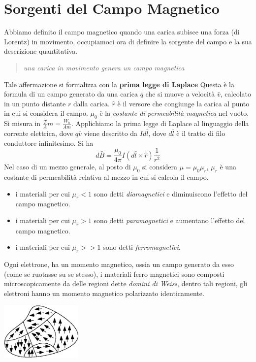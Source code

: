 \documentclass[10pt, letterpaper]{report}
\begin{document}
\section{Sorgenti del Campo Magnetico}
Abbiamo definito il campo magnetico quando una carica subisce una forza (di Lorentz) in movimento, occupiamoci ora di definire la sorgente del campo e la sua descrizione quantitativa. \begin{quote}
    \textit{una carica in movimento genera un campo magnetica}
\end{quote}
Tale affermazione si formalizza con la \textbf{prima legge di Laplace} 
Questa è la formula di un campo generato da una carica $q$ che si muove a velocità $\bar v$, calcolato in un punto distante $r$ dalla carica. $\hat r$ è il versore che congiunge la carica al punto in cui si considera il campo.\acc 
$\mu_0$ è la \textit{costante di permeabilità magnetica} nel vuoto. Si misura in $\frac{T}{A}m=\frac{W_b}{Am}$.\acc 
Applichiamo la prima legge di Laplace al linguaggio della corrente elettrica, dove $q\bar v$ viene descritto da $I d\bar l$, dove $d\bar l$ è il tratto di filo conduttore infinitesimo. Si ha 
$$ d\bar B=\frac{\mu_0}{4\pi}I(d\bar l \times \hat r)\frac{1}{r^2}$$
Nel caso di un mezzo generale, al posto di $\mu_0$ si considera $\mu=\mu_0\mu_r$, $\mu_r$ è una costante di permeabilità relativa al mezzo in cui si calcola il campo.\begin{itemize}
    \item i materiali per cui $\mu_r<1$ sono detti \textit{diamagnetici} e diminuiscono l'effetto del campo magnetico.
    \item i materiali per cui $\mu_r>1$ sono detti \textit{paramagnetici} e aumentano l'effetto del campo magnetico.
    \item i materiali per cui $\mu_r>>1$ sono detti \textit{ferromagnetici}. 
\end{itemize}
Ogni elettrone, ha un momento magnetico, ossia un campo generato da esso (come se ruotasse su se stesso),
i materiali ferro magnetici sono composti microscopicamente da delle regioni dette \textit{domini di Weiss}, dentro tali regioni, gli elettroni hanno un momento magnetico polarizzato identicamente.
\begin{center}
    \includegraphics[width=0.3\textwidth ]{images/ferromagneti2.eps}
\end{center}
\end{document}
